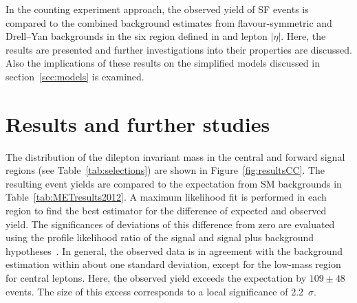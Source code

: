 \label{sec:counting}
In the counting experiment approach, the observed yield of SF events is compared to the combined background estimates from flavour-symmetric and Drell--Yan backgrounds in the six region defined in \mll and lepton $|\eta|$. Here, the results are presented and further investigations into their properties are discussed. Also the implications of these results on the  simplified models discussed in section~\ref{sec:models} is examined.  
\section{Results and further studies}

\label{sec:candcresults}
The distribution of the dilepton invariant mass in the central and forward signal regions (see Table~\ref{tab:selections}) are shown in Figure~\ref{fig:resultsCC}. The resulting event yields are compared to the expectation from SM backgrounds in Table~\ref{tab:METresults2012}. A maximum likelihood fit is performed in each region to find the best estimator for the difference of expected and observed yield. The significances of deviations of this difference from zero are evaluated using the profile likelihood ratio of the signal and signal plus background hypotheses~\cite{HiggsTool1}. In general, the observed data is in agreement with the background estimation within about one standard deviation, except for the low-mass region for central leptons. Here, the observed yield exceeds the expectation by $109\pm48$ events. The size of this excess corresponds to a local significance of 2.2~$\sigma$.  
